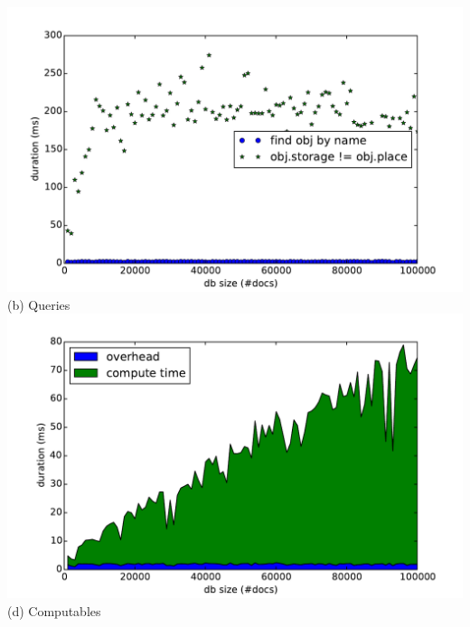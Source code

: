 \begin{frame}
\begin{columns}
\begin{column}{0.55\textwidth}
    \includegraphics[width=\textwidth]{../thesis/plots/query-durations-index}\\
    (b) Queries
    \\\vspace{-0.08cm}
    \includegraphics[width=\textwidth]{../thesis/plots/computable-durations-index}\\
    (d) Computables
    \end{column}
  \end{columns}
\end{frame}

